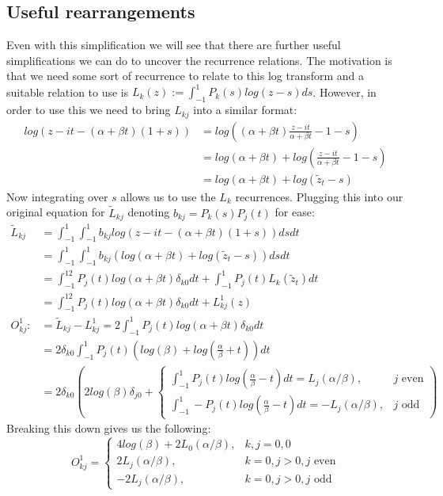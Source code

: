 \documentclass{article}
\begin{document}
\subsection{Useful rearrangements}
Even with this simplification we will see that there are further useful simplifications we can do to uncover the recurrence relations.
The motivation is that we need some sort of recurrence to relate to this log transform and a suitable relation to use is $L_k(z):=\int_{-1}^1P_k(s)log(z-s)ds$.
However, in order to use this we need to bring $L_{kj}$ into a similar format:
\begin{align}
    log(z-it-(\alpha+\beta t)(1+s))&=log((\alpha+\beta t)\frac{z-it}{\alpha+\beta t}-1-s)\\
    &=log(\alpha+\beta t)+log(\frac{z-it}{\alpha+\beta t}-1-s)\\
    &=log(\alpha+\beta t)+log(\tilde{z}_t-s)
\end{align}
Now integrating over $s$ allows us to use the $L_k$ recurrences.
Plugging this into our original equation for $\tilde{L}_{kj}$ denoting $b_{kj}=P_k(s)P_j(t)$ for ease:
\begin{align}
    \tilde{L}_{kj}&=\int_{-1}^1\int_{-1}^1b_{kj}log(z-it-(\alpha+\beta t)(1+s))dsdt\\
    &=\int_{-1}^1\int_{-1}^1b_{kj}(log(\alpha+\beta t)+log(\tilde{z}_t-s))dsdt\\
    &=\int_{-1}^12P_j(t)log(\alpha+\beta t)\delta_{k0}dt+\int_{-1}^1P_j(t)L_k(\tilde{z}_t)dt\\
    &=\int_{-1}^12P_j(t)log(\alpha+\beta t)\delta_{k0}dt+L_{kj}^1(z)\\
    O_{kj}^1:&=\tilde L_{kj}-L_{kj}^1=2\int_{-1}^1P_j(t)log(\alpha+\beta t)\delta_{k0}dt\\
    &=2\delta_{k0}\int_{-1}^1P_j(t)(log(\beta)+log(\frac{\alpha}{\beta}+t))dt\\
    &=2\delta_{k0}(2log(\beta)\delta_{j0}+\begin{cases}
	\int_{-1}^1P_j(t)log(\frac{\alpha}{\beta}-t)dt=L_j(\alpha/\beta),&j\text{ even}\\
	\int_{-1}^1-P_j(t)log(\frac{\alpha}{\beta}-t)dt=-L_j(\alpha/\beta),&j\text{ odd}
    \end{cases})
\end{align}
Breaking this down gives us the following:
$$
O_{kj}^1=\begin{cases}
    4log(\beta)+2L_0(\alpha/\beta),&k,j=0,0\\
    2L_j(\alpha/\beta),&k=0,j>0,j\text{ even}\\
    -2L_j(\alpha/\beta),&k=0,j>0,j\text{ odd}
\end{cases}
$$
\end{document}
